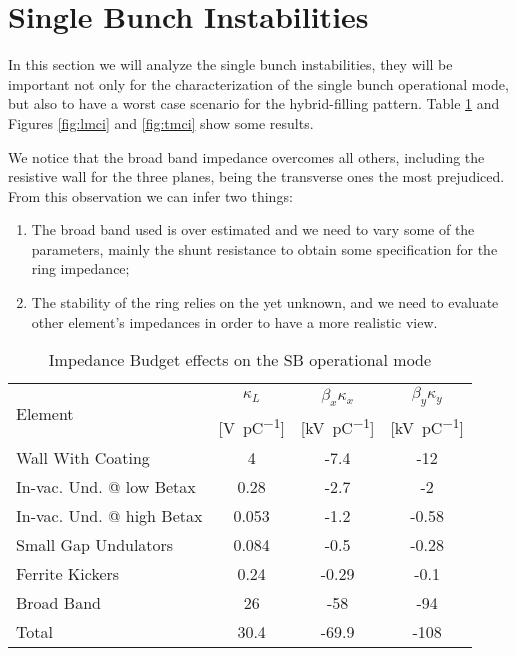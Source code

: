 \section{Single Bunch Instabilities}


In this section we will analyze the single bunch instabilities, they will be important not only for the characterization of the single bunch operational mode, but also to have a worst case scenario for the hybrid-filling pattern. Table \ref{tab:impedance_effect_sb} and Figures \ref{fig:lmci} and \ref{fig:tmci} show some results.

We notice that the broad band impedance overcomes all others, including the resistive wall for the three planes, being the transverse ones the most prejudiced. From this observation we can infer two things:
\begin{enumerate}
 \item The broad band used is over estimated and we need to vary some of the parameters, mainly the shunt resistance to obtain some specification for the ring impedance;
 \item The stability of the ring relies on the yet unknown, and we need to evaluate other element's impedances in order to have a more realistic view.
\end{enumerate}


\begin{table}[!ht]
 \centering
 \caption{Impedance Budget effects on the SB operational mode}
 \label{tab:impedance_effect_sb}
 \begin{tabular}{lccc}
\multirow{2}{*}{Element}&$\kappa_L$&$\beta_x \kappa_x$& $\beta_y \kappa_y$\\
 &[\si{\volt\per\pico\coulomb}] &[\si{\kilo\volt\per\pico\coulomb}] &     [\si{\kilo\volt\per\pico\coulomb}]\\\hline 
Wall With Coating           & 4          &-7.4    &   -12    \\\hline     
In-vac. Und. @ low Betax    & 0.28       &-2.7    &   -2     \\\hline
In-vac. Und. @ high Betax   & 0.053      &-1.2    &   -0.58  \\\hline     
Small Gap Undulators        & 0.084      &-0.5    &   -0.28  \\\hline     
Ferrite Kickers             & 0.24       &-0.29   &   -0.1   \\\hline     
Broad Band                  & 26         &-58     &   -94    \\\hline
Total                       & 30.4       &-69.9   &   -108   \\\hline
\end{tabular}
\end{table}


